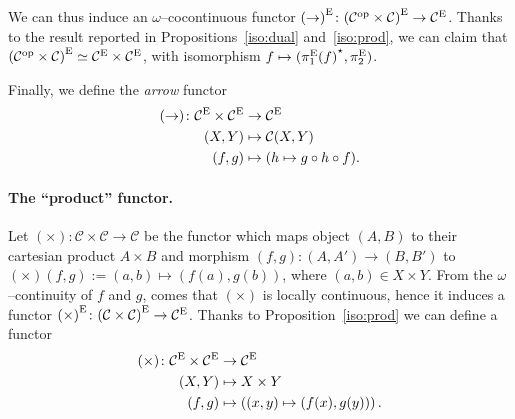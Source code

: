 We can thus induce an \(\omega\)--cocontinuous functor \({(\rightarrow)}^\textup{E} \colon {(\mathcal{C}^\textup{op} \times \mathcal{C})}^\textup{E}\to \mathcal{C}^\textup{E}\). %
Thanks to the result reported in Propositions~\ref{iso:dual} and~\ref{iso:prod}, we can claim that \({(\mathcal{C}^\textup{op} \times \mathcal{C})}^\textup{E} \simeq \mathcal{C}^\textup{E} \times \mathcal{C}^\textup{E}\), with isomorphism
\(f \mapsto ({\pi_1^\textup{E}(f)}^\star, \pi_2^\textup{E})\).

Finally, we define the \emph{arrow} functor
\begin{equation*}
  \begin{split}
    (\rightarrow) \colon \mathcal{C}^\textup{E} \times \mathcal{C}^\textup{E} &\to \mathcal{C}^\textup{E} \\
    (X,Y) &\mapsto \mathcal{C}(X,Y) \\
    (f,g) &\mapsto (h \mapsto g \circ h \circ f).
  \end{split}
\end{equation*}

\paragraph{The ``product'' functor.}
Let \((\times) \colon \mathcal{C} \times \mathcal{C} \to \mathcal{C}\) be the functor which maps object \((A,B)\) to their cartesian product \(A \times B\) and morphism \((f,g) \colon (A,A') \to (B,B')\) to
\((\times)(f,g) := (a,b) \mapsto (f(a),g(b))\), where \((a,b) \in X \times Y\).
From the \(\omega\)--continuity of \(f\) and \(g\), comes that \((\times)\) is locally continuous, hence it induces a functor
\({(\times)}^\textup{E} \colon {(\mathcal{C} \times \mathcal{C})}^\textup{E} \to \mathcal{C}^\textup{E}\).
Thanks to Proposition~\ref{iso:prod} we can define a functor
\begin{equation*}
  \begin{split}
    (\times) \colon \mathcal{C}^\textup{E} \times \mathcal{C}^\textup{E} &\to \mathcal{C}^\textup{E} \\
    (X,Y) &\mapsto X \times Y \\
    (f,g) &\mapsto \left((x,y) \mapsto (f(x),g(y))\right).
  \end{split}
\end{equation*}

